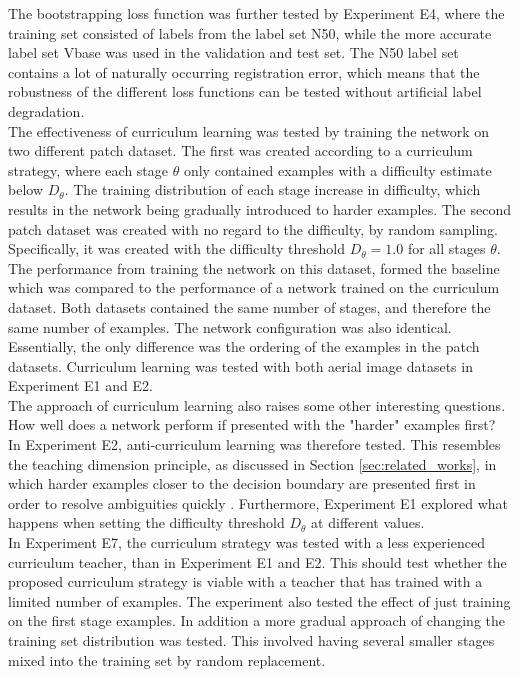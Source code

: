 The bootstrapping loss function was further tested by Experiment E4, where the training set consisted of labels from the label set N50, while the more accurate label set Vbase was used in the validation and test set. The N50 label set contains a lot of naturally occurring registration error, which means that the robustness of the different loss functions can be tested without artificial label degradation.\\

The effectiveness of curriculum learning was tested by training the network on two different patch dataset. The first was created according to a curriculum strategy, where each stage $\theta$ only contained examples with a difficulty estimate below $D_\theta$. The training distribution of each stage increase in difficulty, which results in the network being gradually introduced to harder examples. The second patch dataset was created with no regard to the difficulty, by random sampling. Specifically, it was created with the difficulty threshold $D_\theta =1.0$ for all stages $\theta$. The performance from training the network on this dataset, formed the baseline which was compared to the performance of a network trained on the curriculum dataset. Both datasets contained the same number of stages, and therefore the same number of examples. The network configuration was also identical. Essentially, the only difference was the ordering of the examples in the patch datasets. Curriculum learning was tested with both aerial image datasets in Experiment E1 and E2.\\

The approach of curriculum learning also raises some other interesting questions. How well does a network perform if presented with the "harder" examples first? In Experiment E2, anti-curriculum learning was therefore tested. This resembles the teaching dimension principle, as discussed in Section \ref{sec:related_works}, in which harder examples closer to the decision boundary are presented first in order to resolve ambiguities quickly . Furthermore, Experiment E1 explored what happens when setting the difficulty threshold $D_\theta$ at different values.\\

In Experiment E7, the curriculum strategy was tested with a less experienced curriculum teacher, than in Experiment E1 and E2. This should test whether the proposed curriculum strategy is viable with a teacher that has trained with a limited number of examples. The experiment also tested the effect of just training on the first stage examples. In addition a more gradual approach of changing the training set distribution was tested. This involved having several smaller stages mixed into the training set by random replacement.\\

